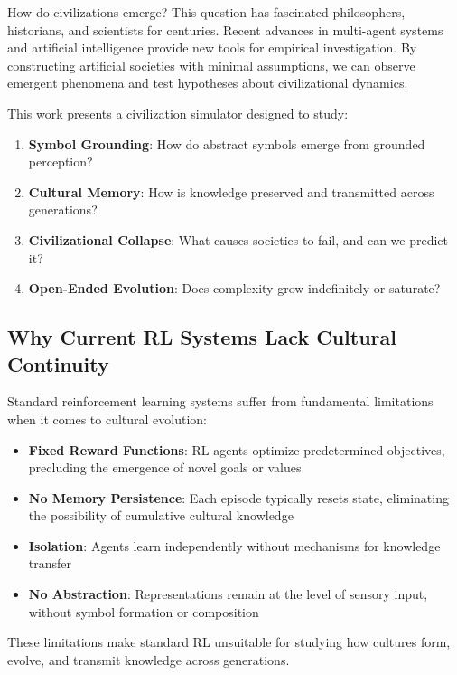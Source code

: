 \documentclass[11pt,a4paper]{article}
\begin{document}
How do civilizations emerge? This question has fascinated philosophers, historians, and scientists for centuries. Recent advances in multi-agent systems and artificial intelligence provide new tools for empirical investigation. By constructing artificial societies with minimal assumptions, we can observe emergent phenomena and test hypotheses about civilizational dynamics.

This work presents a civilization simulator designed to study:

\begin{enumerate}
    \item \textbf{Symbol Grounding}: How do abstract symbols emerge from grounded perception?
    \item \textbf{Cultural Memory}: How is knowledge preserved and transmitted across generations?
    \item \textbf{Civilizational Collapse}: What causes societies to fail, and can we predict it?
    \item \textbf{Open-Ended Evolution}: Does complexity grow indefinitely or saturate?
\end{enumerate}

\subsection{Why Current RL Systems Lack Cultural Continuity}

Standard reinforcement learning systems suffer from fundamental limitations when it comes to cultural evolution:

\begin{itemize}
    \item \textbf{Fixed Reward Functions}: RL agents optimize predetermined objectives, precluding the emergence of novel goals or values
    \item \textbf{No Memory Persistence}: Each episode typically resets state, eliminating the possibility of cumulative cultural knowledge
    \item \textbf{Isolation}: Agents learn independently without mechanisms for knowledge transfer
    \item \textbf{No Abstraction}: Representations remain at the level of sensory input, without symbol formation or composition
\end{itemize}

These limitations make standard RL unsuitable for studying how cultures form, evolve, and transmit knowledge across generations.
\end{document}
